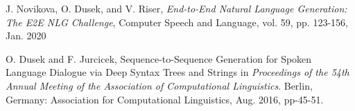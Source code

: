 \documentclass[12pt]{article}
\begin{document}
\pagebreak
\begin{thebibliography}{9}
J. Novikova, O. Dusek, and V. Riser, \textit{End-to-End Natural Language Generation: The E2E NLG Challenge}, Computer Speech and Language, vol. 59, pp. 123-156, Jan. 2020

O. Dusek and F. Jurcicek, Sequence-to-Sequence Generation for Spoken Language Dialogue via Deep Syntax Trees and Strings in \textit{Proceedings of the 54th Annual Meeting of the Association of Computational Linguistics}. Berlin, Germany: Association for Computational Linguistics, Aug. 2016, pp-45-51.

\end{thebibliography}
\end{document}

